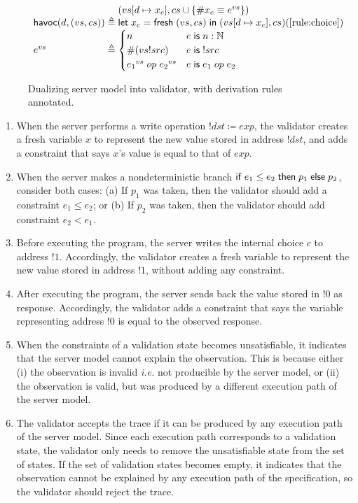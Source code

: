\begin{figure}[h]
\[\begin{array}{l@{\;}r@{\;}l}
&&(\update{vs}{d}{x_e},cs\cup\{\#x_e\equiv e^{vs}\})\\
\Havoc(d,(vs,cs))&\triangleq&\letin{x_c}{\Fresh (vs,cs)}(\update{vs}{d}{x_c},cs)\hfill(\ref{rule:choice})\\
e^{vs}&\triangleq&\begin{cases}
  n&e\Is n:\Nat\\
  \#(vs!src)&e\Is!src\\
  {e_1}^{vs}\oop{e_2}^{vs}&e\Is e_1\oop e_2
\end{cases}
\end{array}\]
\caption[Dualizing server model into validator]{Dualizing server model into
  validator, with derivation rules annotated.}
\label{fig:dualize}
\end{figure}

\begin{enumerate}
\item \label{rule:write} When the server performs a write operation
  $!dst\coloneqq exp$, the validator creates a fresh variable $x$ to represent
  the new value stored in address $!dst$, and adds a constraint that says $x$'s
  value is equal to that of $exp$.
\item \label{rule:branch} When the server makes a nondeterministic branch $\mathsf{if}\;
  e_1\le e_2\;\mathsf{then}\; p_1\;\mathsf{else}\; p_2$, consider both cases: (a) If $p_1$ was taken,
  then the validator should add a constraint $e_1\le e_2$; or (b) If $p_2$ was
  taken, then the validator should add constraint $e_2<e_1$.
\item \label{rule:choice} Before executing the program, the server writes the internal
    choice $c$ to address $!1$.  Accordingly, the validator creates a fresh
    variable to represent the new value stored in address $!1$, without adding
    any constraint.
\item \label{rule:return} After executing the program, the server sends back the
  value stored in $!0$ as response.  Accordingly, the validator adds a
  constraint that says the variable representing address $!0$ is equal to the
  observed response.
\item \label{rule:unsat} When the constraints of a validation state becomes
  unsatisfiable, it indicates that the server model cannot explain the
  observation.  This is because either (i) the observation is invalid {\it i.e.}
  not producible by the server model, or (ii) the observation is valid, but was
  produced by a different execution path of the server model.
\item \label{rule:reject} The validator accepts the trace if it can be produced
  by any execution path of the server model.  Since each execution path
  corresponds to a validation state, the validator only needs to remove the
  unsatisfiable state from the set of states.  If the set of validation states
  becomes empty, it indicates that the observation cannot be explained by any
  execution path of the specification, so the validator should reject the trace.
\end{enumerate}

